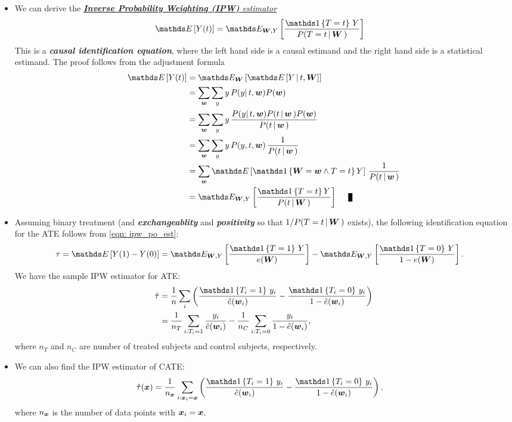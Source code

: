 \documentclass[11pt]{article}
\begin{document}
\begin{itemize}
\item We can derive the \underline{\emph{\textbf{Inverse Probability Weighting (IPW)} estimator}}
\begin{align}
\E{}{Y(t)} &= \E{\mb{W},Y}{\frac{\ind{T=t}\,Y}{P(T=t\,|\,\mb{W}\,)}} \label{eqn: ipw_po_est}
\end{align} This is a \emph{\textbf{causal identification equation}}, where the left hand side is a causal estimand and the right hand side is a statistical estimand.
The proof follows from the adjustment formula 
\begin{align*}
\E{}{Y(t)} &= \E{\mb{W}}{\E{}{Y \,|\, t, \mb{W}}}\\
&=\sum_{\mb{w}} \sum_{y}y\, P(y |\, t, \mb{w})P(\mb{w})  \\
&= \sum_{\mb{w}} \sum_{y}y\, \frac{P(y |\, t, \mb{w})P(t\,|\,\mb{w}\,)P(\mb{w}) }{P(t\,|\,\mb{w}\,)}\\
&= \sum_{\mb{w}} \sum_{y} y\, P(y, t, \mb{w})\, \frac{1}{P(t\,|\,\mb{w}\,)}\\
&= \sum_{\mb{w}} \E{}{\ind{\mb{W}=\mb{w} \land T=t} Y} \,\frac{1}{P(t\,|\,\mb{w}\,)}\\
&= \E{\mb{W}, Y}{\frac{\ind{T=t} Y}{P(t\,|\,\mb{W}\,)}} \qed
\end{align*}

\item Assuming binary treatment (and \emph{\textbf{exchangeablity}} and \emph{\textbf{positivity}} so that $1/P(T=t\,|\,\boldsymbol{W}\,)$ exists), the following identification equation for the ATE follows from \eqref{eqn: ipw_po_est}:
\begin{align}
\tau= \E{}{Y(1) - Y(0)} &=\E{\mb{W}, Y}{\frac{\ind{T=1}\,Y}{e(\mb{W})}} - \E{\mb{W}, Y}{\frac{\ind{T=0}\,Y}{1 - e(\mb{W})}}. \label{eqn: ipw_ate}
\end{align}
We have the sample IPW estimator for ATE: 
\begin{align}
\hat{\tau}&= \frac{1}{n}\sum_{i}\paren{\frac{\ind{T_i=1}\,y_i}{\hat{e}(\mb{w}_i)} - \frac{\ind{T_i=0}\,y_i}{1 - \hat{e}(\mb{w}_i)}} \nonumber \\
&= \frac{1}{n_{T}}\sum_{i: T_i = 1}\frac{y_i}{\hat{e}(\mb{w}_i)} - \frac{1}{n_{C}}\sum_{i: T_i = 0} \frac{y_i}{1 - \hat{e}(\mb{w}_i)}, \label{eqn: ipw_ate_est}
\end{align} where $n_T$ and $n_C$ are number of treated subjects and control subjects, respectively.

\item We can also find the IPW estimator of CATE:
\begin{align}
\hat{\tau}(\mb{x})&=  \frac{1}{n_{\mb{x}}}\sum_{i: \mb{x}_i = \mb{x}}\paren{\frac{\ind{T_i=1}\,y_i}{\hat{e}(\mb{w}_i)} - \frac{\ind{T_i=0}\,y_i}{1 - \hat{e}(\mb{w}_i)}}, \label{eqn: ipw_cate_est}
\end{align} where $n_{\boldsymbol{x}}$ is the number of data points with $\boldsymbol{x}_i = \boldsymbol{x}$. 


\end{itemize}
\end{document}

